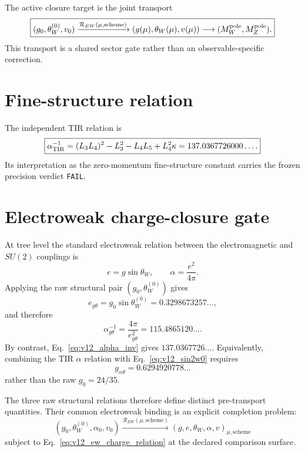 The active closure target is the joint transport
\begin{equation}
\boxed{
(g_0,\theta_W^{(0)},v_0)
\xrightarrow{\mathcal R_{EW}(\mu,\mathrm{scheme})}
(g(\mu),\theta_W(\mu),v(\mu))
\longrightarrow
(M_W^{\rm pole},M_Z^{\rm pole}).
}
\label{eq:v12_rew}
\end{equation}
This transport is a shared sector gate rather than an observable-specific correction.

\section{Fine-structure relation}

The independent TIR relation is
\begin{equation}
\boxed{
\alpha_{\rm TIR}^{-1}
=(L_3L_4)^2-L_3^2-L_4L_5+L_4^2\kappa
=137.0367726000\ldots .
}
\label{eq:v12_alpha_inv}
\end{equation}
Its interpretation as the zero-momentum fine-structure constant carries the frozen precision verdict \texttt{FAIL}.

\section{Electroweak charge-closure gate}

At tree level the standard electroweak relation between the electromagnetic and $SU(2)$ couplings is
\begin{equation}
e=g\sin\theta_W,
\qquad
\alpha=\frac{e^2}{4\pi}.
\label{eq:v12_ew_charge_relation}
\end{equation}
Applying the raw structural pair $(g_0,\theta_W^{(0)})$ gives
\begin{equation}
e_{g\theta}=g_0\sin\theta_W^{(0)}
=0.3298673257\ldots,
\end{equation}
and therefore
\begin{equation}
\boxed{
\alpha_{g\theta}^{-1}
=\frac{4\pi}{e_{g\theta}^2}
=115.4865120\ldots .
}
\label{eq:v12_alpha_from_gtheta}
\end{equation}
By contrast, Eq.~\eqref{eq:v12_alpha_inv} gives $137.0367726\ldots$. Equivalently, combining the TIR $\alpha$ relation with Eq.~\eqref{eq:v12_sin2w0} requires
\begin{equation}
\boxed{g_{\alpha\theta}=0.6294920778\ldots}
\end{equation}
rather than the raw $g_0=24/35$.

The three raw structural relations therefore define distinct pre-transport quantities. Their common electroweak binding is an explicit completion problem:
\begin{equation}
\boxed{
(g_0,\theta_W^{(0)},\alpha_0,v_0)
\xrightarrow{\mathcal R_{EW}(\mu,\mathrm{scheme})}
(g,e,\theta_W,\alpha,v)_{\mu,\mathrm{scheme}}
}
\label{eq:v12_ew_full_closure}
\end{equation}
subject to Eq.~\eqref{eq:v12_ew_charge_relation} at the declared comparison surface.

